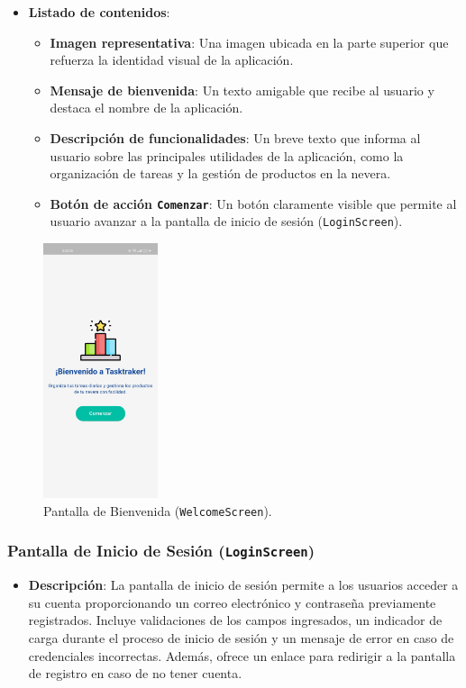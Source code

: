 \documentclass{article}
\begin{document}
\begin{flushleft}
\begin{itemize}
    \item \textbf{Listado de contenidos}: 
    \begin{itemize}
        \item \textbf{Imagen representativa}: Una imagen ubicada en la parte superior que refuerza la identidad visual de la aplicaci\'on.
        \item \textbf{Mensaje de bienvenida}: Un texto amigable que recibe al usuario y destaca el nombre de la aplicaci\'on.
        \item \textbf{Descripci\'on de funcionalidades}: Un breve texto que informa al usuario sobre las principales utilidades de la aplicaci\'on, como la organizaci\'on de tareas y la gesti\'on de productos en la nevera.
        \item \textbf{Bot\'on de acci\'on \texttt{Comenzar}}: Un bot\'on claramente visible que permite al usuario avanzar a la pantalla de inicio de sesi\'on (\texttt{LoginScreen}).
    \end{itemize}
\end{itemize}

\begin{figure}[H]
    \centering
    \includegraphics[width=0.3\textwidth]{TFG/img/img/welcome.jpeg}
    \caption{Pantalla de Bienvenida (\texttt{WelcomeScreen}).}
    \label{fig:welcome_screen}
\end{figure}

\clearpage


\subsubsection{Pantalla de Inicio de Sesi\'on (\texttt{LoginScreen})}
\begin{itemize}
    \item \textbf{Descripci\'on}: 
    La pantalla de inicio de sesi\'on permite a los usuarios acceder a su cuenta proporcionando un correo electr\'onico y contrase\~na previamente registrados. Incluye validaciones de los campos ingresados, un indicador de carga durante el proceso de inicio de sesi\'on y un mensaje de error en caso de credenciales incorrectas. Adem\'as, ofrece un enlace para redirigir a la pantalla de registro en caso de no tener cuenta.


\end{itemize}
\end{flushleft}
\end{document}
